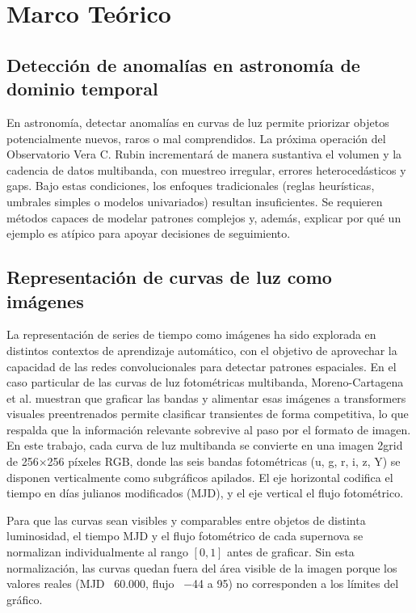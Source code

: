 \chapter{Marco Teórico}

\section{Detección de anomalías en astronomía de dominio temporal}

En astronomía, detectar anomalías en curvas de luz permite priorizar objetos potencialmente nuevos, raros o mal comprendidos. La próxima operación del Observatorio Vera C. Rubin incrementará de manera sustantiva el volumen y la cadencia de datos multibanda, con muestreo irregular, errores heterocedásticos y gaps. Bajo estas condiciones, los enfoques tradicionales (reglas heurísticas, umbrales simples o modelos univariados) resultan insuficientes. Se requieren métodos capaces de modelar patrones complejos y, además, explicar por qué un ejemplo es atípico para apoyar decisiones de seguimiento.

\section{Representación de curvas de luz como imágenes}

La representación de series de tiempo como imágenes ha sido explorada en distintos contextos de aprendizaje automático, con el objetivo de aprovechar la capacidad de las redes convolucionales para detectar patrones espaciales. En el caso particular de las curvas de luz fotométricas multibanda, Moreno-Cartagena et al. \cite{moreno2025swinv2} muestran que graficar las bandas y alimentar esas imágenes a transformers visuales preentrenados permite clasificar transientes de forma competitiva, lo que respalda que la información relevante sobrevive al paso por el formato de imagen. En este trabajo, cada curva de luz multibanda se convierte en una imagen 2grid de 256×256 píxeles RGB, donde las seis bandas fotométricas (u, g, r, i, z, Y) se disponen verticalmente como subgráficos apilados. El eje horizontal codifica el tiempo en días julianos modificados (MJD), y el eje vertical el flujo fotométrico.

Para que las curvas sean visibles y comparables entre objetos de distinta luminosidad, el tiempo MJD y el flujo fotométrico de cada supernova se normalizan individualmente al rango $[0, 1]$ antes de graficar. Sin esta normalización, las curvas quedan fuera del área visible de la imagen porque los valores reales (MJD ~60.000, flujo ~$-$44 a 95) no corresponden a los límites del gráfico.

